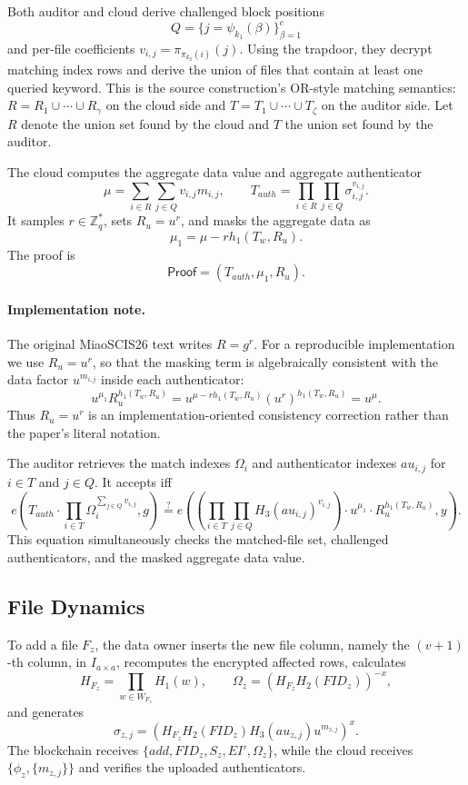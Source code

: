 \documentclass[11pt]{article}
\newcommand{\Zq}{\mathbb{Z}_q}
\begin{document}
Both auditor and cloud derive challenged block positions
\[
    Q=\{j=\psi_{k_1}(\beta)\}_{\beta=1}^{c}
\]
and per-file coefficients \(v_{i,j}=\pi_{\pi_{k_2}(i)}(j)\).  Using the
trapdoor, they decrypt matching index rows and derive the union of files that
contain at least one queried keyword.  This is the source construction's
OR-style matching semantics: \(R=R_1\cup\cdots\cup R_\gamma\) on the cloud
side and \(T=T_1\cup\cdots\cup T_\zeta\) on the auditor side.  Let \(R\)
denote the union set found by the cloud and \(T\) the union set found by the
auditor.

The cloud computes the aggregate data value and aggregate authenticator
\[
    \mu=\sum_{i\in R}\sum_{j\in Q} v_{i,j}m_{i,j},
    \qquad
    T_{auth}=\prod_{i\in R}\prod_{j\in Q}\sigma_{i,j}^{v_{i,j}}.
\]
It samples \(r\in\Zq^\ast\), sets \(R_u=u^r\), and masks the aggregate data as
\[
    \mu_1=\mu-rh_1(T_w,R_u).
\]
The proof is
\[
    \mathsf{Proof}=(T_{auth},\mu_1,R_u).
\]
\paragraph{Implementation note.}
The original MiaoSCIS26 text writes \(R=g^r\).  For a reproducible
implementation we use \(R_u=u^r\), so that the masking term is algebraically
consistent with the data factor \(u^{m_{i,j}}\) inside each authenticator:
\[
    u^{\mu_1}R_u^{h_1(T_w,R_u)}
    =u^{\mu-rh_1(T_w,R_u)}(u^r)^{h_1(T_w,R_u)}
    =u^\mu .
\]
Thus \(R_u=u^r\) is an implementation-oriented consistency correction rather
than the paper's literal notation.

The auditor retrieves the match indexes \(\Omega_i\) and authenticator indexes
\(au_{i,j}\) for \(i\in T\) and \(j\in Q\).  It accepts iff
\[
e\!\left(
    T_{auth}\cdot
    \prod_{i\in T}\Omega_i^{\sum_{j\in Q}v_{i,j}},
    g
\right)
\stackrel{?}{=}
e\!\left(
    \left(\prod_{i\in T}\prod_{j\in Q}H_3(au_{i,j})^{v_{i,j}}\right)
    \cdot u^{\mu_1}\cdot R_u^{h_1(T_w,R_u)},
    y
\right).
\]
This equation simultaneously checks the matched-file set, challenged
authenticators, and the masked aggregate data value.

\subsection{File Dynamics}

To add a file \(F_z\), the data owner inserts the new file column, namely the
\((v+1)\)-th column, in \(I_{a\times a}\), recomputes the encrypted affected
rows, calculates
\[
    H_{F_z}=\prod_{w\in W_{F_z}}H_1(w),\qquad
    \Omega_z=(H_{F_z}H_2(FID_z))^{-x},
\]
and generates
\[
    \sigma_{z,j}=
    \left(H_{F_z}H_2(FID_z)H_3(au_{z,j})u^{m_{z,j}}\right)^x.
\]
The blockchain receives \(\{add,FID_z,S_z,EI',\Omega_z\}\), while the cloud
receives \(\{\phi_z,\{m_{z,j}\}\}\) and verifies the uploaded authenticators.
\end{document}
